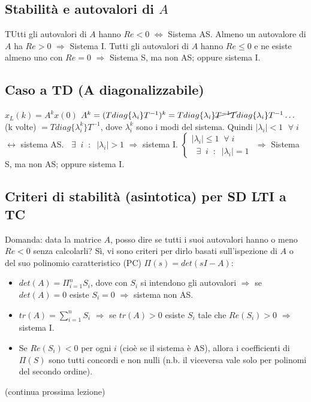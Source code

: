 \subsection*{Stabilità e autovalori di $A$}
TUtti gli autovalori di $A$ hanno $Re <0$ $\Longleftrightarrow$ Sistema AS.\newline
\newline
Almeno un autovalore di $A$ ha $Re > 0$ $\Longrightarrow$ Sistema I.\newline
\newline
Tutti gli autovalori di $A$ hanno $Re \leq 0$ e ne esiste almeno uno con $Re = 0$ $\Longrightarrow$ Sistema S, ma non AS; oppure sistema I.
\subsection*{Caso a TD (A diagonalizzabile)}
$x_L(k) = A^k x(0)$\newline
$A^k = (T diag\{\lambda_i\} T^{-1})^k = T diag\{\lambda_i\}\cancel{T^{-1}T} diag\{\lambda_i\} T^{-1} \dots$ (k volte) $= T diag\{\lambda_i^k\}T^{-1}$, dove $\lambda_i^{k}$ sono i modi del sistema.\newline
\newline
Quindi \newline
$|\lambda_i| < 1$ $\;\forall\;i$ $\longleftrightarrow$ sistema AS.\newline
\newline
$\;\;\exists\;\; i \;\;:\;\; |\lambda_i| > 1$ $\Longrightarrow$ sistema I.\newline
\newline
$\begin{cases}
    |\lambda_i| \leq 1 \;\;\forall\; i\\
    \;\;\exists\;\;i \;\;:\;\;|\lambda_i| = 1 
\end{cases}$ $\Longrightarrow$ Sistema S, ma non AS; oppure sistema I.
\subsection*{Criteri di stabilità (asintotica) per SD LTI a TC}
Domanda: data la matrice $A$, posso dire se tutti i suoi autovalori hanno o meno $Re <0$ senza calcolarli?\newline
\newline
Sì, vi sono criteri per dirlo basati sull'ispezione di $A$ o del suo polinomio caratteristico (PC) $\Pi(s) = det (sI-A)$:
\begin{itemize}
    \item $det(A) = \Pi_{i=1}^{n}S_i$, dove con $S_i$ si intendono gli autovalori $\Longrightarrow$ se $det(A) = 0$ esiste $S_i = 0$ $\Longrightarrow$ sistema non AS.
    \item $tr(A) = \sum_{i=1}^{n}S_i$ $\Longrightarrow$ se $tr(A) >0$ esiste $S_i$ tale che $Re(S_i) > 0$ $\Longrightarrow$ sistema I.
    \item Se $Re(S_i)<0$ per ogni $i$ (cioè se il sistema è AS), allora i coefficienti di $\Pi(S)$ sono tutti concordi e non nulli (n.b. il viceversa vale solo per polinomi del secondo ordine).
\end{itemize}
(continua prossima lezione)